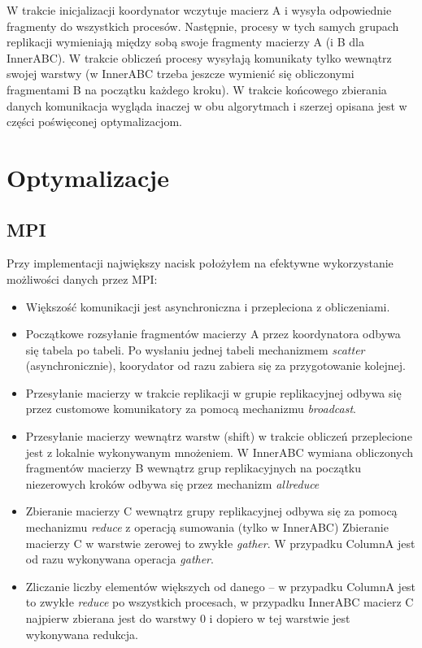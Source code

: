\documentclass{article}
\begin{document}
W trakcie inicjalizacji koordynator wczytuje macierz A i wysyła odpowiednie fragmenty do wszystkich procesów.
Następnie, procesy w tych samych grupach replikacji wymieniają między sobą swoje fragmenty macierzy A (i B dla InnerABC).
W trakcie obliczeń procesy wysyłają komunikaty tylko wewnątrz swojej warstwy (w InnerABC trzeba jeszcze wymienić się obliczonymi fragmentami B
na początku każdego kroku).
W trakcie końcowego zbierania danych komunikacja wygląda inaczej w obu algorytmach i szerzej opisana jest
w części poświęconej optymalizacjom.

\section{Optymalizacje}
\subsection{MPI}
Przy implementacji największy nacisk położyłem na efektywne wykorzystanie możliwości danych przez MPI:
\begin{itemize}
\item Większość komunikacji jest asynchroniczna i przepleciona z obliczeniami. 
\item Początkowe rozsyłanie fragmentów macierzy A przez koordynatora odbywa się tabela po tabeli. 
         Po wysłaniu jednej tabeli mechanizmem \emph{scatter} (asynchronicznie), 
         koorydator od razu zabiera się za przygotowanie kolejnej.
\item Przesyłanie macierzy w trakcie replikacji w grupie replikacyjnej 
         odbywa się przez customowe komunikatory za pomocą mechanizmu \emph{broadcast}.
\item Przesyłanie macierzy wewnątrz warstw (shift) w trakcie obliczeń przeplecione jest z lokalnie wykonywanym mnożeniem.
         W InnerABC wymiana obliczonych fragmentów macierzy B wewnątrz grup replikacyjnych 
         na początku niezerowych kroków odbywa się przez mechanizm \emph{allreduce}
\item Zbieranie macierzy C wewnątrz grupy replikacyjnej odbywa się za pomocą mechanizmu \emph{reduce} z operacją sumowania (tylko w InnerABC)
         Zbieranie macierzy C w warstwie zerowej to zwykłe \emph{gather}. W przypadku ColumnA jest od razu wykonywana operacja \emph{gather}.
\item Zliczanie liczby elementów większych od danego -- w przypadku ColumnA jest to zwykłe \emph{reduce} po wszystkich procesach,
         w przypadku InnerABC macierz C najpierw zbierana jest do warstwy 0 i dopiero w tej warstwie jest wykonywana redukcja.
\end{itemize}
\end{document}
